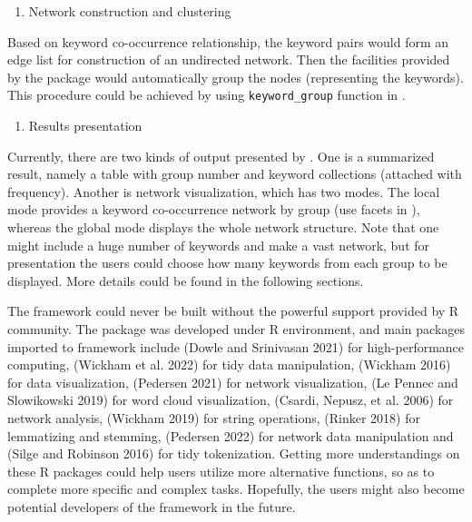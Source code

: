 \begin{enumerate}
\def\labelenumi{(\arabic{enumi})}
\setcounter{enumi}{2}
\tightlist
\item
  Network construction and clustering
\end{enumerate}

Based on keyword co-occurrence relationship, the keyword pairs would form an edge list for construction of an undirected network. Then the facilities provided by the  package would automatically group the nodes (representing the keywords). This procedure could be achieved by using \texttt{keyword\_group} function in .

\begin{enumerate}
\def\labelenumi{(\arabic{enumi})}
\setcounter{enumi}{3}
\tightlist
\item
  Results presentation
\end{enumerate}

Currently, there are two kinds of output presented by . One is a summarized result, namely a table with group number and keyword collections (attached with frequency). Another is network visualization, which has two modes. The local mode provides a keyword co-occurrence network by group (use facets in ), whereas the global mode displays the whole network structure. Note that one might include a huge number of keywords and make a vast network, but for presentation the users could choose how many keywords from each group to be displayed. More details could be found in the following sections.

The  framework could never be built without the powerful support provided by R community. The  package was developed under R environment, and main packages imported to  framework include  (Dowle and Srinivasan 2021) for high-performance computing,  (Wickham et al. 2022) for tidy data manipulation,  (Wickham 2016) for data visualization,  (Pedersen 2021) for network visualization,  (Le Pennec and Slowikowski 2019) for word cloud visualization,  (Csardi, Nepusz, et al. 2006) for network analysis,  (Wickham 2019) for string operations,  (Rinker 2018) for lemmatizing and stemming,  (Pedersen 2022) for network data manipulation and  (Silge and Robinson 2016) for tidy tokenization. Getting more understandings on these R packages could help users utilize more alternative functions, so as to complete more specific and complex tasks. Hopefully, the users might also become potential developers of the  framework in the future.

